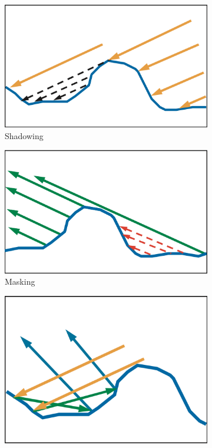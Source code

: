 \begin{figure}
	\begin{subfigure}[b]{0.34\textwidth}
		\includegraphics[width=1.\textwidth]{graphics/gi/ray-optics-10-1}
		\caption{Shadowing}
	\end{subfigure}
	\begin{subfigure}[b]{0.34\textwidth}
		\includegraphics[width=1.\textwidth]{graphics/gi/ray-optics-10-2}
		\caption{Masking}
	\end{subfigure}
	\begin{subfigure}[b]{0.283\textwidth}
		\includegraphics[width=1.\textwidth]{graphics/gi/ray-optics-10-3}

\end{subfigure}
\end{figure}
